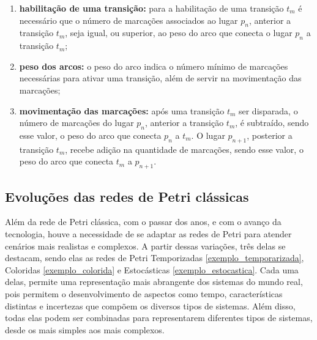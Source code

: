 \documentclass[
	12pt,				%
	openright,			%
	oneside,			%
	a4paper,			%
	english,			%
	brazil				%
	]{abntex2}
\newtheorem{exemplo}{Exemplo}
\begin{document}
 \begin{enumerate}[label=(\alph*)]
    \item \textbf{habilitação de uma transição:} para a habilitação de uma transição $t_{m}$ é necessário que o número de marcações associados ao lugar $p_{n}$, anterior a transição $t_{m}$, seja igual, ou superior, ao peso do arco que conecta o lugar $p_{n}$ a transição $t_{m}$;
    \item \textbf{peso dos arcos:} o peso do arco indica o número mínimo de marcações necessárias para ativar uma transição, além de servir na movimentação das marcações;
    \item \textbf{movimentação das marcações:} após uma transição $t_{m}$ ser disparada, o número de marcações do lugar $p_{n}$, anterior a transição $t_{m}$, é subtraído, sendo esse valor, o peso do arco que conecta $p_{n}$ a $t_{m}$. O lugar $p_{n + 1}$, posterior a transição $t_{m}$, recebe adição na quantidade de marcações, sendo esse valor, o peso do arco que conecta $t_{m}$ a $p_{n + 1}$. 
\end{enumerate}





    


\subsection*{Evoluções das redes de Petri clássicas}

Além da rede de Petri clássica, com o passar dos anos, e com o avanço da tecnologia, houve a necessidade de se adaptar as redes de Petri para atender cenários mais realistas e complexos. A partir dessas variações, três delas se destacam, sendo elas as redes de Petri Temporizadas \ref{exemplo_temporarizada}, Coloridas \ref{exemplo_colorida} e Estocásticas \ref{exemplo_estocastica}. Cada uma delas, permite uma representação mais abrangente dos sistemas do mundo real, pois permitem o desenvolvimento de aspectos como tempo, características distintas e incertezas que compõem os diversos tipos de sistemas. Além disso, todas elas podem ser combinadas para representarem diferentes tipos de sistemas, desde os mais simples aos mais complexos. 
\end{document}
